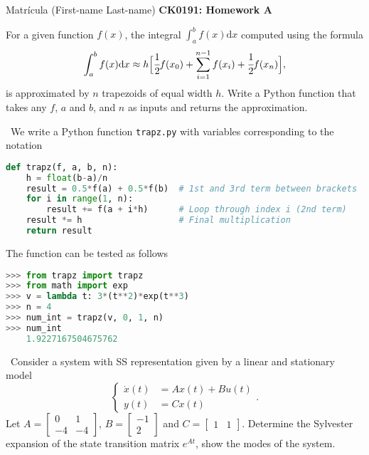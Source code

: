 \documentclass[11pt]{article}
\newenvironment{EX}[2][Exercise]{\begin{trivlist}
\item[{\color{red} \hskip \labelsep {\bfseries #1}\hskip \labelsep {\bfseries #2.}}]}{\end{trivlist}}
\newenvironment{SL}[1][Solution]{\begin{trivlist}
\item[{\color{blue} \hskip \labelsep {\bfseries #1:}}]}{\end{trivlist}}
\begin{document}

\noindent Matr\'icula (First-name Last-name) \hfill {\Large \bfseries CK0191: Homework A} \\

\begin{EX}{A.1}
For a given function $f(x)$, the integral $\int_{a}^{b}{f(x)\text{d}x}$ computed using the formula
\begin{equation}
\int_{a}^{b}{f(x)\text{d}x} \approx h \Big[ \cfrac{1}{2}f(x_0) + \sum_{i=1}^{n-1}{f(x_i) + \cfrac{1}{2}f(x_n)} \Big], 
\end{equation}
is approximated by $n$ trapezoids of equal width $h$. 
\vskip0.250cm
\noindent Write a Python function that takes any $f$, $a$ and $b$, and $n$ as inputs and returns the approximation. 
\end{EX}

\begin{SL}\
We write a Python function \texttt{trapz.py} with variables corresponding to the notation
\begin{lstlisting}[language=Python]
def trapz(f, a, b, n):
    h = float(b-a)/n
    result = 0.5*f(a) + 0.5*f(b)  # 1st and 3rd term between brackets 
    for i in range(1, n):
        result += f(a + i*h)      # Loop through index i (2nd term)
    result *= h                   # Final multiplication
    return result
\end{lstlisting}
The function can be tested as follows
\begin{lstlisting}[language=Python]
>>> from trapz import trapz
>>> from math import exp
>>> v = lambda t: 3*(t**2)*exp(t**3)
>>> n = 4
>>> num_int = trapz(v, 0, 1, n)
>>> num_int
    1.9227167504675762
\end{lstlisting}
\end{SL}


\begin{EX}{A.2} \
Consider a system with SS representation given by a linear and stationary model
$$
\begin{cases}
\dot{x}(t) & = Ax(t) + Bu(t) \\
y(t)       & = Cx(t)
\end{cases}.
$$
Let $A=\begin{bmatrix} 0 & 1 \\ -4 & -4 \end{bmatrix}$, $B=\begin{bmatrix}-1 \\ 2\end{bmatrix}$ and $C=\begin{bmatrix}1 & 1 \end{bmatrix}$.
\vskip0.250cm
\noindent Determine the Sylvester expansion of the state transition matrix $e^{At}$, show the modes of the system.
\end{EX}
\end{document}
